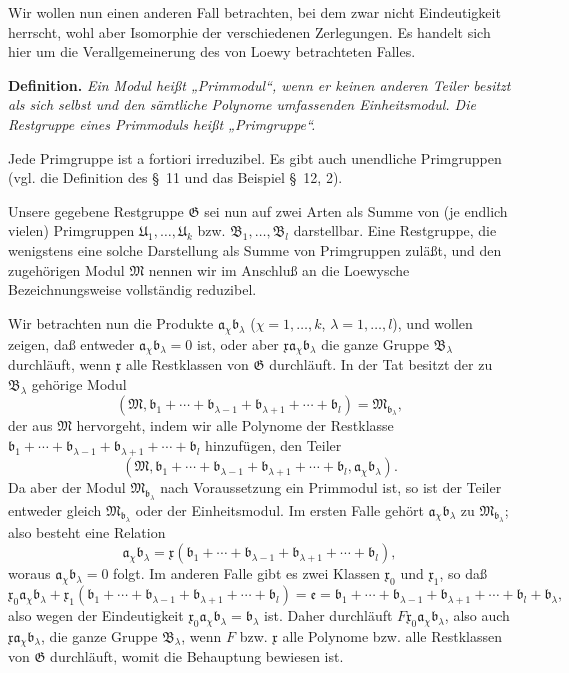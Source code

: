\documentclass[11pt]{article}
\newcommand{\mM}{\mathfrak{M}}
\newcommand{\mG}{\mathfrak{G}}
\newcommand{\mB}{\mathfrak{B}}
\newcommand{\ma}{\mathfrak{a}}
\newcommand{\mb}{\mathfrak{b}}
\newcommand{\mx}{\mathfrak{x}}
\newcommand{\me}{\mathfrak{e}}
\providecommand{\mU}{\mathfrak{U}}
\begin{document}
Wir wollen nun einen anderen Fall betrachten, bei dem zwar nicht Eindeutigkeit herrscht, wohl aber Isomorphie der verschiedenen Zerlegungen. Es handelt sich hier um die Verallgemeinerung des von Loewy betrachteten Falles.

\textbf{Definition.} \emph{Ein Modul heißt „Primmodul“, wenn er keinen anderen Teiler besitzt als sich selbst und den sämtliche Polynome umfassenden Einheitsmodul. Die Restgruppe eines Primmoduls heißt „Primgruppe“.}

Jede Primgruppe ist a fortiori irreduzibel. Es gibt auch unendliche Primgruppen (vgl. die Definition des \S~11 und das Beispiel \S~12, 2).

Unsere gegebene Restgruppe $\mG$ sei nun auf zwei Arten als Summe von (je endlich vielen) Primgruppen $\mU_1,\ldots,\mU_k$ bzw. $\mB_1,\ldots,\mB_l$ darstellbar. Eine Restgruppe, die wenigstens eine solche Darstellung als Summe von Primgruppen zuläßt, und den zugehörigen Modul $\mM$ nennen wir im Anschluß an die Loewysche Bezeichnungsweise vollständig reduzibel.

Wir betrachten nun die Produkte $\ma_\chi\mb_\lambda$ ($\chi=1,\ldots,k$, $\lambda=1,\ldots,l$), und wollen zeigen, daß entweder $\ma_\chi\mb_\lambda=0$ ist, oder aber $\mx\ma_\chi\mb_\lambda$ die ganze Gruppe $\mB_\lambda$ durchläuft, wenn $\mx$ alle Restklassen von $\mG$ durchläuft. In der Tat besitzt der zu $\mB_\lambda$ gehörige Modul
\[
 (\mM,\mb_1+\cdots+\mb_{\lambda-1}+\mb_{\lambda+1}+\cdots+\mb_l)=\mM_{\mb_\lambda},
\]
der aus $\mM$ hervorgeht, indem wir alle Polynome der Restklasse $\mb_1+
\cdots+\mb_{\lambda-1}+\mb_{\lambda+1}+\cdots+\mb_l$ hinzufügen, den Teiler
\[
 (\mM,\mb_1+\cdots+\mb_{\lambda-1}+\mb_{\lambda+1}+\cdots+\mb_l,
 \ma_\chi\mb_\lambda).
\]
Da aber der Modul $\mM_{\mb_\lambda}$ nach Voraussetzung ein Primmodul ist, so ist der Teiler entweder gleich $\mM_{\mb_\lambda}$ oder der Einheitsmodul. Im ersten Falle gehört $\ma_\chi\mb_\lambda$ zu $\mM_{\mb_\lambda}$; also besteht eine Relation
\[
 \ma_\chi\mb_\lambda=\mx(\mb_1+
\cdots+\mb_{\lambda-1}+\mb_{\lambda+1}+\cdots+\mb_l),
\]
woraus $\ma_\chi\mb_\lambda=0$ folgt. Im anderen Falle gibt es zwei Klassen $\mx_0$ und $\mx_1$, so daß
\[
 \mx_0\ma_\chi\mb_\lambda
 +\mx_1(\mb_1+\cdots+\mb_{\lambda-1}+\mb_{\lambda+1}+\cdots+\mb_l)
 =\me=\mb_1+\cdots+\mb_{\lambda-1}+\mb_{\lambda+1}+\cdots+\mb_l+\mb_\lambda,
\]
also wegen der Eindeutigkeit $\mx_0\ma_\chi\mb_\lambda=\mb_\lambda$ ist. Daher durchläuft $F\mx_0\ma_\chi\mb_\lambda$, also auch $\mx\ma_\chi\mb_\lambda$, die ganze Gruppe $\mB_\lambda$, wenn $F$ bzw. $\mx$ alle Polynome bzw. alle Restklassen von $\mG$ durchläuft, womit die Behauptung bewiesen ist.
\end{document}
